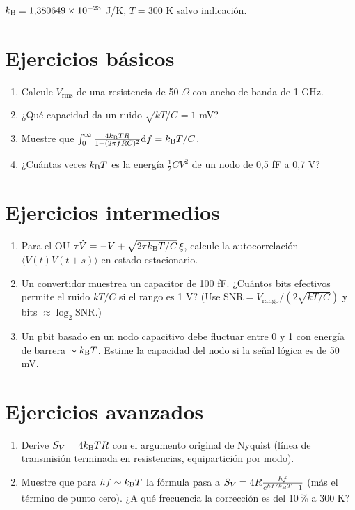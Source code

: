 \documentclass[11pt,a4paper]{article}
\begin{document}
$k_{\mathrm B}=1{,}380649\times10^{-23}$ J/K, $T=300$ K salvo indicación.

\section{Ejercicios básicos}
\begin{enumerate}[label=\textbf{B\arabic*.}]
\item Calcule $V_{\text{rms}}$ de una resistencia de 50 $\Omega$ con ancho de banda de 1 GHz.
\item ¿Qué capacidad da un ruido $\sqrt{kT/C}=1$ mV?
\item Muestre que $\int_0^\infty\frac{4k_{\mathrm B} TR}{1+(2\pi fRC)^2}\mathrm{d} f=k_{\mathrm B} T/C$.
\item ¿Cuántas veces $k_{\mathrm B} T$ es la energía $\frac12CV^2$ de un nodo de 0,5 fF a 0,7 V?
\end{enumerate}

\section{Ejercicios intermedios}
\begin{enumerate}[label=\textbf{I\arabic*.}]
\item Para el OU $\tau\dot V=-V+\sqrt{2\tau k_{\mathrm B} T/C}\,\xi$, calcule la autocorrelación $\langle V(t)V(t+s)\rangle$ en estado estacionario.
\item Un convertidor muestrea un capacitor de 100 fF. ¿Cuántos bits efectivos permite el ruido $kT/C$ si el rango es 1 V? (Use $\text{SNR}=V_{\text{rango}}/(2\sqrt{kT/C})$ y bits $\approx\log_2\text{SNR}$.)
\item Un pbit basado en un nodo capacitivo debe fluctuar entre 0 y 1 con energía de barrera $\sim k_{\mathrm B} T$. Estime la capacidad del nodo si la señal lógica es de 50 mV.
\end{enumerate}

\section{Ejercicios avanzados}
\begin{enumerate}[label=\textbf{A\arabic*.}]
\item Derive $S_V=4k_{\mathrm B} TR$ con el argumento original de Nyquist (línea de transmisión terminada en resistencias, equipartición por modo).
\item Muestre que para $hf\sim k_{\mathrm B} T$ la fórmula pasa a $S_V=4R\frac{hf}{e^{hf/k_{\mathrm B} T}-1}$ (más el término de punto cero). ¿A qué frecuencia la corrección es del 10\,\% a 300 K?
\end{enumerate}
\end{document}
